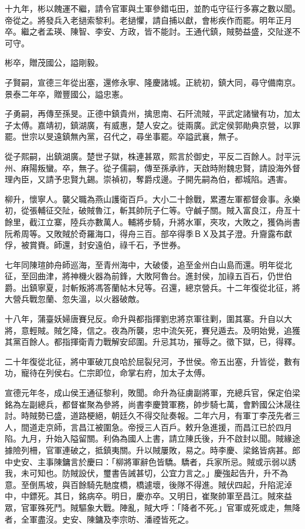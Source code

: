 \begin{pinyinscope}
十九年，彬以餽運不繼，請令官軍與土軍參錯屯田，並酌屯守征行多寡之數以聞。帝從之。將發兵入老撾索黎利。老撾懼，請自捕以獻，會彬疾作而罷。明年正月卒。繼之者孟瑛、陳智、李安、方政，皆不能討。王通代鎮，賊勢益盛，交阯遂不可守。

彬卒，贈茂國公，謚剛毅。

子賢嗣，宣德三年從出塞，還修永寧、隆慶諸城。正統初，鎮大同，尋守備南京。景泰二年卒，贈豐國公，謚忠憲。

子勇嗣，再傳至孫旻。正德中鎮貴州，擒思南、石阡流賊，平武定諸蠻有功，加太子太傅。嘉靖初，鎮湖廣，有威惠，楚人安之。徙兩廣。武定侯郭勛典京營，以罪罷。世宗以旻遠鎮無內黨，召代之，尋坐事罷。卒謚武襄，無子。

從子熙嗣，出鎮湖廣。楚世子獄，株連甚眾，熙言於御史，平反二百餘人。討平沅州、麻陽叛蠻。卒，無子。從子儒嗣，傳至孫承祚，天啟時附魏忠賢，請設海外督理內臣，又請予忠賢九錫。崇禎初，奪爵戍邊。子開先嗣為伯，都城陷。遇害。

柳升，懷寧人。襲父職為燕山護衛百戶。大小二十餘戰，累遷左軍都督僉事。永樂初，從張輔征交阯，破賊魯江，斬其帥阮子仁等。守鹹子關。賊入富良江，舟亙十餘里，截江立寨，陸兵亦數萬人。輔將步騎，升將水軍，夾攻，大敗之，獲偽尚書阮希周等。又敗賊於奇羅海口，得舟三百。部卒得季ＢＸ及其子澄。升齎露布獻俘，被賞賚。師還，封安遠伯，祿千石，予世券。

七年同陳瑄帥舟師巡海，至青州海中，大破倭，追至金州白山島而還。明年從北征，至回曲津，將神機火器為前鋒，大敗阿魯台。進封侯，加祿五百石，仍世伯爵。出鎮寧夏，討斬叛將馮答蘭帖木兒等。召還，總京營兵。十二年復從北征，將大營兵戰忽蘭、忽失溫，以火器破敵。

十八年，蒲臺妖婦唐賽兒反。命升與都指揮劉忠將京軍往剿，圍其寨。升自以大將，意輕賊。賊乞降，信之。夜為所襲，忠中流矢死，賽兒遁去。及明始覺，追獲其黨百餘人。都指揮衛青力戰解安邱圍。升忌其功，摧辱之。徵下獄，已，得釋。

二十年復從北征，將中軍破兀良哈於屈裂兒河，予世侯。帝五出塞，升皆從，數有功，寵待在列侯右。仁宗即位，命掌右府，加太子太傅。

宣德元年冬，成山侯王通征黎利，敗聞。命升為征虜副將軍，充總兵官，保定伯梁銘為左副總兵，都督崔聚為參將，尚書李慶贊軍務，帥步騎七萬，會黔國公沐晟往討。時賊勢已盛，道路梗絕，朝廷久不得交阯奏報。二年六月，有軍丁李茂先者三人，間道走京師，言昌江被圍急。帝授三人百戶。敕升急進援，而昌江已於四月陷。九月，升始入隘留關。利偽為國人上書，請立陳氏後，升不啟封以聞。賊緣途據險列柵，官軍連破之，抵鎮夷關。升以賊屢敗，易之。時李慶、梁銘皆病甚。郎中史安、主事陳鏞言於慶曰：「柳將軍辭色皆驕。驕者，兵家所忌。賊或示弱以誘我，未可知也。防賊設伏，璽書告誡甚切，公宜力言之。」慶強起告升，升不為意。至倒馬坡，與百餘騎先馳度橋，橋遽壞，後隊不得進。賊伏四起，升陷泥淖中，中鏢死。其日，銘病卒。明日，慶亦卒。又明日，崔聚帥軍至昌江。賊來益眾，官軍殊死鬥。賊驅象大戰。陣亂，賊大呼：「降者不死。」官軍或死或走，無降者，全軍盡沒。史安、陳鏞及李宗昉、潘禋皆死之。


\end{pinyinscope}

